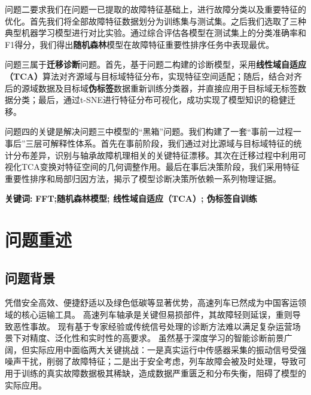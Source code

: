 \documentclass[a4paper]{CPIPC}
\numberwithin{equation}{section}
\begin{document}
问题二要求我们在问题一已提取的故障特征基础上，进行故障分类以及重要特征的优化。首先我们将全部故障特征数据划分为训练集与测试集。之后我们选取了三种典型机器学习模型进行对比实验。通过综合评估各模型在测试集上的分类准确率和F1得分，我们得出\textbf{随机森林}模型在故障特征重要性排序任务中表现最优。

问题三属于\textbf{迁移诊断}问题。首先，基于问题二构建的诊断模型，采用\textbf{线性域自适应（TCA）}算法对齐源域与目标域特征分布，实现特征空间适配；随后，结合对齐后的源域数据及目标域\textbf{伪标签}数据重新训练分类器，并直接应用于目标域无标签数据分类；最后，通过t-SNE进行特征分布可视化，成功实现了模型知识的稳健迁移。

问题四的关键是解决问题三中模型的“黑箱”问题。我们构建了一套“事前一过程一事后”三层可解释性体系。首先在事前阶段，我们通过对比源域与目标域特征的统计分布差异，识别与轴承故障机理相关的关键特征漂移。其次在迁移过程中利用可视化TCA变换对特征空间的几何调整作用。最后在事后决策阶段，我们采用特征重要性排序和局部归因方法，揭示了模型诊断决策所依赖一系列物理证据。


\vspace{1em}
\noindent  {}\textbf{{关键词:}}  \textbf{FFT;随机森林模型; 线性域自适应（TCA）; 伪标签自训练}



\newpage

\begin{center}
\tableofcontents
\end{center}


\newpage
\section{问题重述}

\subsection{问题背景}

凭借安全高效、便捷舒适以及绿色低碳等显著优势，高速列车已然成为中国客运领域的核心运输工具。
高速列车轴承是关键但易损部件，其故障轻则延误，重则导致恶性事故。
现有基于专家经验或传统信号处理的诊断方法难以满足复杂运营场景下对精度、泛化性和实时性的高要求。
虽然基于深度学习的智能诊断前景广阔，但实际应用中面临两大关键挑战：一是真实运行中传感器采集的振动信号受强噪声干扰，削弱了故障特征；二是出于安全考虑，列车故障会被及时处理，导致可用于训练的真实故障数据极其稀缺，造成数据严重匮乏和分布失衡，阻碍了模型的实际应用。
\end{document}
